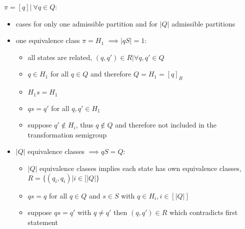 \documentclass[a4paper,12pt,numbers=noenddot]{scrreport}
\begin{document}
$\pi = {[q] |\ \forall q \in Q}$:
\begin{itemize}
    \item cases for only one admissible partition and for $|Q|$ admissible partitions
    \item one equivalence class $\pi = H_1$ $\implies |qS| = 1$: 
        \begin{itemize}
            \item all states are related, $(q,q') \in R | \forall q,q' \in Q$
            \item $q \in H_1$ for all $q \in Q$  and therefore $Q = H_1 = [q]_R$
            \item $H_1s = H_1$
            \item $qs = q'$ for all $q,q' \in H_1$
            \item suppose $q' \notin H_i$, thus $q \notin Q$ and therefore not included in the transformation semigroup
        \end{itemize}
    \item $|Q|$ equivalence classes $\implies qS = Q$:
        \begin{itemize}
            \item $|Q|$ equivalence classes implies each state has own equivalence classes, $R = \{(q_i, q_i) | i \in [|Q|\}$
            \item $qs = q$ for all $q \in Q$ and $s \in S$ with $q \in H_i, i \in [|Q|]$
            \item suppose $qs = q'$ with $q \neq q'$ then $(q, q') \in R$ which contradicts first statement
        \end{itemize}
\end{itemize}


\section{}


\section{}
\end{document}

